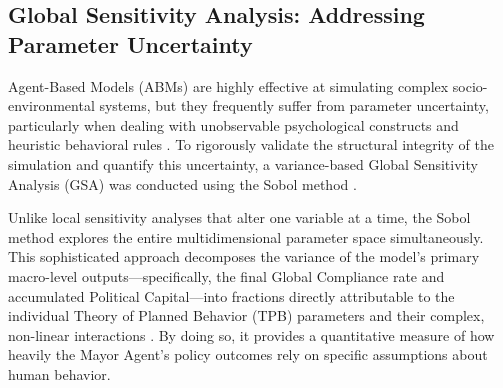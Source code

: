 \subsection{Global Sensitivity Analysis: Addressing Parameter Uncertainty}

Agent-Based Models (ABMs) are highly effective at simulating complex socio-environmental systems, but they frequently suffer from parameter uncertainty, particularly when dealing with unobservable psychological constructs and heuristic behavioral rules \citep{McCulloch2022}. To rigorously validate the structural integrity of the simulation and quantify this uncertainty, a variance-based Global Sensitivity Analysis (GSA) was conducted using the Sobol method \citep{Sobol2001}. 

Unlike local sensitivity analyses that alter one variable at a time, the Sobol method explores the entire multidimensional parameter space simultaneously. This sophisticated approach decomposes the variance of the model's primary macro-level outputs—specifically, the final Global Compliance rate and accumulated Political Capital—into fractions directly attributable to the individual Theory of Planned Behavior (TPB) parameters and their complex, non-linear interactions \citep{ZhengAI2022}. By doing so, it provides a quantitative measure of how heavily the Mayor Agent's policy outcomes rely on specific assumptions about human behavior.

